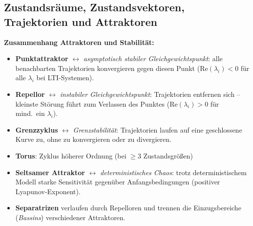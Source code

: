 \newpage

\subsection{Zustandsräume, Zustandsvektoren, Trajektorien und Attraktoren}





\textbf{Zusammenhang Attraktoren und Stabilität:}
\begin{itemize}[leftmargin=1.5em]
    \item \textbf{Punktattraktor} $\leftrightarrow$ \textit{asymptotisch stabiler Gleichgewichtspunkt}: alle benachbarten Trajektorien konvergieren gegen diesen Punkt ($\mathrm{Re}(\lambda_i) < 0$ für alle $\lambda_i$ bei LTI-Systemen).
    \item \textbf{Repellor} $\leftrightarrow$ \textit{instabiler Gleichgewichtspunkt}: Trajektorien entfernen sich -- kleinste Störung führt zum Verlassen des Punktes ($\mathrm{Re}(\lambda_i) > 0$ für mind.\ ein $\lambda_i$).
    \item \textbf{Grenzzyklus} $\leftrightarrow$ \textit{Grenzstabilität}: Trajektorien laufen auf eine geschlossene Kurve zu, ohne zu konvergieren oder zu divergieren.
    \item \textbf{Torus}: Zyklus höherer Ordnung (bei $\geq 3$ Zustandsgrößen)
    \item \textbf{Seltsamer Attraktor} $\leftrightarrow$ \textit{deterministisches Chaos}: trotz deterministischem Modell starke Sensitivität gegenüber Anfangsbedingungen (positiver Lyapunov-Exponent).
    \item \textbf{Separatrizen} verlaufen durch Repelloren und trennen die Einzugsbereiche (\emph{Bassins}) verschiedener Attraktoren.
\end{itemize}

